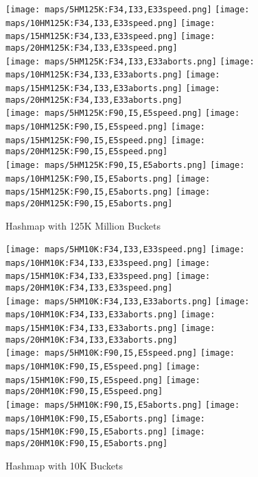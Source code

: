 \begin{figure}[h!]
    \centering
    \texttt{[image: maps/5HM125K:F34,I33,E33speed.png]}
    \texttt{[image: maps/10HM125K:F34,I33,E33speed.png]}
    \texttt{[image: maps/15HM125K:F34,I33,E33speed.png]}
    \texttt{[image: maps/20HM125K:F34,I33,E33speed.png]}
    \\
    \texttt{[image: maps/5HM125K:F34,I33,E33aborts.png]}
    \texttt{[image: maps/10HM125K:F34,I33,E33aborts.png]}
    \texttt{[image: maps/15HM125K:F34,I33,E33aborts.png]}
    \texttt{[image: maps/20HM125K:F34,I33,E33aborts.png]}
    \\
    \texttt{[image: maps/5HM125K:F90,I5,E5speed.png]}
    \texttt{[image: maps/10HM125K:F90,I5,E5speed.png]}
    \texttt{[image: maps/15HM125K:F90,I5,E5speed.png]}
    \texttt{[image: maps/20HM125K:F90,I5,E5speed.png]}
    \\
    \texttt{[image: maps/5HM125K:F90,I5,E5aborts.png]}
    \texttt{[image: maps/10HM125K:F90,I5,E5aborts.png]}
    \texttt{[image: maps/15HM125K:F90,I5,E5aborts.png]}
    \texttt{[image: maps/20HM125K:F90,I5,E5aborts.png]}
\caption{Hashmap with 125K Million Buckets}
\label{fig:ntqueues}
\end{figure}

\begin{figure}[h!]
    \centering
    \texttt{[image: maps/5HM10K:F34,I33,E33speed.png]}
    \texttt{[image: maps/10HM10K:F34,I33,E33speed.png]}
    \texttt{[image: maps/15HM10K:F34,I33,E33speed.png]}
    \texttt{[image: maps/20HM10K:F34,I33,E33speed.png]}
    \\
    \texttt{[image: maps/5HM10K:F34,I33,E33aborts.png]}
    \texttt{[image: maps/10HM10K:F34,I33,E33aborts.png]}
    \texttt{[image: maps/15HM10K:F34,I33,E33aborts.png]}
    \texttt{[image: maps/20HM10K:F34,I33,E33aborts.png]}
    \\
    \texttt{[image: maps/5HM10K:F90,I5,E5speed.png]}
    \texttt{[image: maps/10HM10K:F90,I5,E5speed.png]}
    \texttt{[image: maps/15HM10K:F90,I5,E5speed.png]}
    \texttt{[image: maps/20HM10K:F90,I5,E5speed.png]}
    \\
    \texttt{[image: maps/5HM10K:F90,I5,E5aborts.png]}
    \texttt{[image: maps/10HM10K:F90,I5,E5aborts.png]}
    \texttt{[image: maps/15HM10K:F90,I5,E5aborts.png]}
    \texttt{[image: maps/20HM10K:F90,I5,E5aborts.png]}
\caption{Hashmap with 10K Buckets}
\label{fig:ntqueues}
\end{figure}

